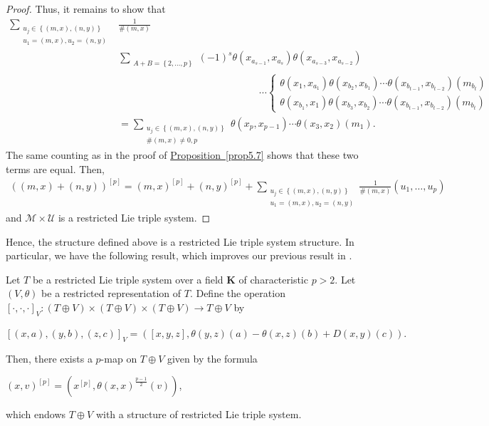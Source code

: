 \documentclass[11pt, twoside]{article}
\begin{document}
\begin{proof}
Thus, it remains to show that \begin{align*}
        \sum_{\substack{u_j\in \left\{(m,x),(n,y) \right\}\\u_1=(m,x),u_2=(n,y)}}&\frac{1}{\#(m,x)}\\ &\sum_{\substack{A+B=\left\{2,\ldots,p\right\}}}(-1)^s\theta(x_{a_{s-1}},x_{a_s})\theta(x_{a_{s-3}},x_{a_{s-2}}) \\ & \,\,\,\,\,\,\,\,\,\,\,\,\,\,\,\,\,\,\,\,\,\,\,\,\,\,\,\,\,\,\,\,\,\,\,\,\,\,\,\,\,\,\,\,\,\,\,\,\,\,\,\,\,\,\,\,\,\,\,\,\,\,\,\,\,\,\,\,\,\,\,\,\,\,\,\,\,\,\,\,\,\,\,\,\,\cdots \left\{\begin{matrix}
\theta (x_1,x_{a_1})\theta(x_{b_2},x_{b_1})\cdots\theta(x_{b_{t-1}},x_{b_{t-2}})(m_{b_t}) \\\theta (x_{b_1},x_1)\theta(x_{b_3},x_{b_2})\cdots\theta(x_{b_{t-1}},x_{b_{t-2}})(m_{b_t})
\end{matrix}\right.\\ &= \sum_{\substack{u_j\in \left\{(m,x),(n,y) \right\}\\ \#(m,x)\neq 0,p}}\theta(x_{p},x_{p-1})\cdots\theta(x_3,x_2)(m_1).
    \end{align*} The same counting as in the proof of \hyperref[prop5.7]{Proposition~\ref*{prop5.7}} shows that these two terms are equal. Then, \begin{align*}
        ((m,x)+(n,y))^{[p]}= (m,x)^{[p]}+(n,y)^{[p]}+\sum_{\substack{u_j\in \left\{(m,x),(n,y) \right\}\\ u_1=(m,x),u_2=(n,y)}}\frac{1}{\#(m,x)}(u_1,\ldots,u_p)
    \end{align*} and $\mathcal{M}\times \mathcal{U} $ is a restricted Lie triple system.

\end{proof}

Hence, the structure defined above is a restricted Lie triple system structure. In particular, we have the following result, which improves our previous result in \cite{BM26}.

\begin{thm}
     Let $T$ be a restricted Lie triple system over a field $\mathbf{K} $ of characteristic $p>2 $. Let $(V,\theta)$ be a restricted representation of $T$. Define the operation $[\cdot,\cdot,\cdot]_V: (T\oplus V)\times (T\oplus V)\times (T\oplus V)\to T\oplus V  $ by \begin{center}
        $[(x,a),(y,b),(z,c)]_V=([x,y,z], \theta(y,z)(a)-\theta(x,z)(b)+ D(x,y)(c)) .$ 
    \end{center}  Then, there exists a $p$-map on $T\oplus V$ given by the formula \begin{center}
        $(x,v)^{[p]}=(x^{[p]},\theta(x,x)^{\frac{p-1}{2}}(v))$,
    \end{center} which endows $T\oplus V $ with a structure of restricted Lie triple system.
\end{thm}
\end{document}
